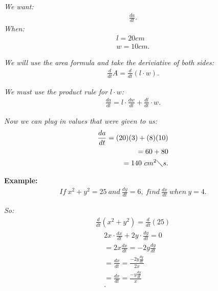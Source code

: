 \documentclass{report}
\begin{document}
    \bigbreak \noindent 
    \textit{We want:}
    \begin{align*}
      \frac{da}{dt}
    .\end{align*}
    \bigbreak \noindent 
    \textit{When:}
    \begin{align*}
      l = 20cm \\ 
      w = 10cm
    .\end{align*}

    \bigbreak \noindent 
    \textit{We will use the area formula and take the deriviative of both sides:}
    \begin{align*}
      \frac{d}{dt} A = \frac{d}{dt}(l \cdot w)
    .\end{align*}

    \bigbreak \noindent 
    \textit{We must use the product rule for $l \cdot w$:}
    \begin{align*}
      \frac{da}{dt} = l \cdot \frac{dw}{dt} + \frac{dl}{dt} \cdot w
    .\end{align*}

    \bigbreak \noindent 
    \textit{Now we can plug in values that were given to us:}
    \begin{align*}
      \frac{da}{dt} = (20)(3) + (8)(10) \\ 
      = 60 + 80 \\ 
      = 140\ cm^{2} \diagdown s
    .\end{align*}

    \pagebreak \bigbreak \noindent
    \begin{mdframed}
      \textbf{Example:}
      \begin{align*}
        If\ x^{2} + y^{2} = 25\ and\ \frac{dy}{dt} = 6,\ find\ \frac{dx}{dt}\ when\ y = 4
      .\end{align*}
    \end{mdframed}
    \bigbreak \noindent
    \textit{So:}
    \begin{align*}
      \frac{d}{dt} (x^{2} + y^{2}) = \frac{d}{dt} (25)
    \end{align*}
    \begin{align*}
      2x \cdot \frac{dx}{dt} + 2y \cdot \frac{dy}{dt} = 0 \\ 
      =2x\frac{dx}{dt} = -2y \frac{dy}{dt} \\
      =\frac{dx}{dt} = \frac{-2y \frac{dy}{dt}}{2x} \\
      =\frac{dx}{dt} = \frac{-y \frac{dy}{dt}}{x} \\
    .\end{align*}
\end{document}
